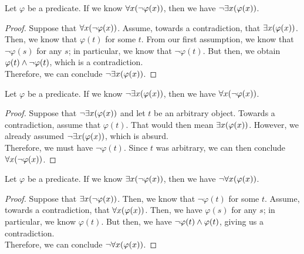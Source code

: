 \begin{lemma}\label{lem:forall}
    Let \(\varphi\) be a predicate.
    If we know \(\forall x \pn*{\neg \varphi(x)}\), then we have \(\neg \exists x \pn*{\varphi(x)}\).
\end{lemma}
\begin{proof}
    Suppose that \(\forall x \pn*{\neg \varphi(x)}\).
    Assume, towards a contradiction, that \(\exists x \pn*{\varphi(x)}\).
    Then, we know that \(\varphi(t)\) for some \(t\).
    From our first assumption, we know that \(\neg \varphi(s)\) for any \(s\);
    in particular, we know that \(\neg \varphi(t)\).
    But then, we obtain \(\varphi(t) \wedge \neg \varphi(t)\), which is a contradiction. \contradiction\\
    Therefore, we can conclude \(\neg \exists x \pn*{\varphi(x)}\).
\end{proof}

\begin{lemma}\label{lem:negexists}
    Let \(\varphi\) be a predicate.
    If we know \(\neg \exists x \pn*{\varphi(x)}\), then we have \(\forall x \pn*{\neg \varphi(x)}\).
\end{lemma}
\begin{proof}
    Suppose that \(\neg \exists x \pn*{\varphi(x)}\) and let \(t\) be an arbitrary object.
    Towards a contradiction, assume that \(\varphi(t)\).
    That would then mean \(\exists x \pn*{\varphi(x)}\).
    However, we already assumed \(\neg \exists x \pn*{\varphi(x)}\), which is absurd. \contradiction\\
    Therefore, we must have \(\neg \varphi(t)\).
    Since \(t\) was arbitrary, we can then conclude \(\forall x \pn*{\neg \varphi(x)}\).
\end{proof}

\begin{lemma}\label{lem:exists}
    Let \(\varphi\) be a predicate.
    If we know \(\exists x \pn*{\neg \varphi(x)}\), then we have \(\neg \forall x \pn*{\varphi(x)}\).
\end{lemma}
\begin{proof}
    Suppose that \(\exists x \pn*{\neg \varphi(x)}\).
    Then, we know that \(\neg \varphi(t)\) for some \(t\).
    Assume, towards a contradiction, that \(\forall x \pn*{\varphi(x)}\).
    Then, we have \(\varphi(s)\) for any \(s\);
    in particular, we know \(\varphi(t)\).
    But then, we have \(\neg \varphi(t) \wedge \varphi(t)\), giving us a contradiction. \contradiction\\
    Therefore, we can conclude \(\neg \forall x \pn*{\varphi(x)}\).
\end{proof}

